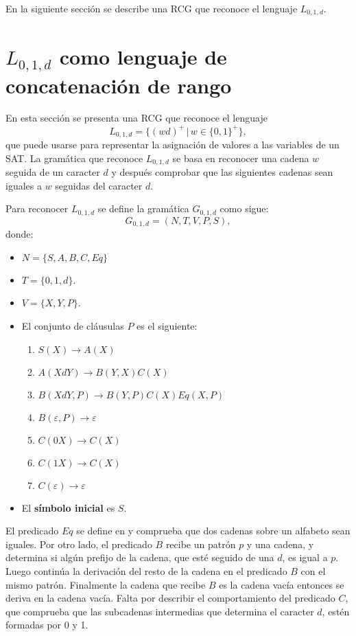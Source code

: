 \documentclass[12pt]{article}
\begin{document}
En la siguiente sección se describe una RCG que reconoce el lenguaje $L_{0,1,d}$.

\section{$L_{0,1,d}$ como lenguaje de concatenación de rango}

En esta sección se presenta una RCG que reconoce el lenguaje $$L_{0,1,d}=\{(wd)^+\,|\,w\in\{0,1\}^+\},$$ que puede usarse para representar la asignación de valores a las variables de un SAT. La gramática que reconoce $L_{0,1,d}$ se basa en reconocer una cadena $w$ seguida de un caracter $d$ y después comprobar que las siguientes cadenas sean iguales a $w$ seguidas del caracter $d$.

Para reconocer $L_{0,1,d}$ se define la gramática $G_{0,1,d}$ como sigue:
\[
    G_{0,1,d} = (N, T, V, P, S),
\]
donde:

\begin{itemize}
    \item $N=\{S,A,B,C,Eq\}$
    \item $T=\{0,1,d\}$.
    \item $V=\{X,Y,P\}$.
    \item El conjunto de cláusulas $P$ es el siguiente:
          \begin{enumerate}
              \item $S(X)\to A(X)$
              \item $A(XdY)\to B(Y,X)C(X)$
              \item $B(XdY,P)\to B(Y,P) C(X) Eq(X,P)$
              \item $B(\varepsilon,P)\to \varepsilon$
              \item $C(0X)\to C(X)$
              \item $C(1X)\to C(X)$
              \item $C(\varepsilon)\to \varepsilon$
          \end{enumerate}
    \item El \textbf{símbolo inicial} es $S$.
\end{itemize}

El predicado $Eq$ se define en \cite{mainRCGBib} y comprueba que dos cadenas sobre un alfabeto sean iguales.  
Por otro lado, el predicado $B$ recibe un patrón $p$ y una cadena, y determina si algún prefijo de la cadena, 
que esté seguido de una $d$, es igual a  $p$. Luego continúa la derivación del resto de la cadena en el predicado 
$B$ con el mismo patrón. Finalmente la cadena que recibe $B$ es la cadena vacía entonces se deriva en la 
cadena vacía. Falta por describir el comportamiento del predicado $C$, que comprueba que las subcadenas intermedias que determina
el caracter $d$, estén formadas por 0 y 1.
\end{document}
